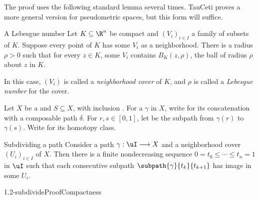The proof uses the following standard lemma several times. TauCeti proves a
more general version for pseudometric spaces, but this form will suffice.

\begin{lemma}[id=1.1]{A Lebesgue number}
Let $K\subseteq\R^n$ be compact and $(V_i)_{i\in I}$ a family of subsets of $K$.
Suppose every point of $K$ has some $V_i$ as a neighborhood.
There is a radius $\rho>0$ such that for every $z\in K$, some $V_i$
contains $B_K(z,\rho)$, the ball of radius $\rho$ about $z$ in $K$.
\end{lemma}
In this case, $(V_i)$ is called a \emph{neighborhood cover} of $K$,
and $\rho$ is called a \emph{Lebesgue number} for the cover.

Let $X$ be a  and $S\subseteq X$,
with inclusion .
For a  $\gamma$ in $X$, write
 for its concatenation
with a composable path $\delta$.
For $r,s\in[0,1]$, let
be the subpath from $\gamma(r)$ to $\gamma(s)$.
Write  for its homotopy class.

\begin{proposition}[id=1.2]{Subdividing a path}
Consider a path $\gamma:\uI\longrightarrow X$ and a neighborhood cover
$(U_i)_{i\in I}$ of $X$.
Then there is a finite nondecreasing
sequence $0=t_0\le\cdots\le t_n=1$ in $\uI$ such
that each consecutive subpath $\subpath{\gamma}{t_k}{t_{k+1}}$ has image in some $U_i$.
\end{proposition}

\begin{proofpassage}{1.2-subdivide}{Proof}{Compactness}
\end{proofpassage}


